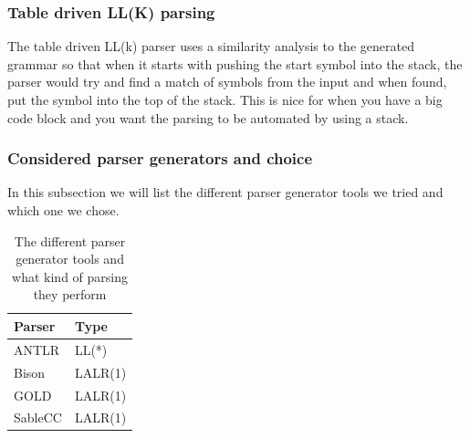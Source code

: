 \subsubsection*{Table driven LL(K) parsing}
The table driven LL(k) parser uses a similarity analysis to the generated grammar so that when it starts with pushing the start symbol into the stack, the parser would try and find a match of symbols from the input and when found, put the symbol into the top of the stack\cite{crafting-a-compiler}. This is nice for when you have a big code block and you want the parsing to be automated by using a stack.

\subsubsection{Considered parser generators and choice}
In this subsection we will list the different parser generator tools we tried and which one we chose. \\

\begin{table}[h]
\centering
\begin{tabular}{@{}ll@{}}
\toprule
\textbf{Parser} & \textbf{Type} \\ \midrule
ANTLR           & LL(*)         \\
Bison           & LALR(1)       \\
GOLD            & LALR(1)       \\
SableCC         & LALR(1)       \\ \bottomrule
\end{tabular}
\caption{The different parser generator tools and what kind of parsing they perform}
\label{parser_table}
\end{table}

